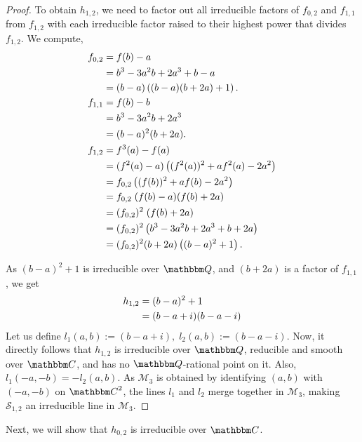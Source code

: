 \documentclass[reqno]{amsart}
\numberwithin{equation}{section}
\theoremstyle{plain}
\theoremstyle{definition}
\theoremstyle{definition}
\newcommand{\Q}{{\mathbbm Q}}
\newcommand{\C}{{\mathbbm C}}
\begin{document}
    \begin{proof}
        To obtain $h_{1,2}$, we need to factor out all irreducible factors of $f_{0,2}$ and $f_{1,1}$ from $f_{1,2}$ with each irreducible factor raised to their highest power that divides $f_{1,2}$. We compute,  
        \begin{align}
            f_{0,2} & =f(b)-a \notag\\
            & = b^{3} -3a^{2}b+2a^{3}+b-a \notag\\
            & = (b-a)\left((b-a)(b+2a)+1\right). \label{h023.}\\
            f_{1,1} & =f(b)-b \notag \\
            & =b^{3}-3a^{2}b+2a^{3}\notag \\
            & =(b-a)^{2}(b+2a).\label{f113}\\
            f_{1,2} & =f^{3}(a)-f(a)\notag \\
            & =(f^{2}(a)-a)\left((f^{2}(a))^{2}+af^{2}(a)-2a^{2}\right)\notag \\
            & = f_{0,2} \left((f(b))^{2}+af(b)-2a^{2}\right)\notag \\
            & = f_{0,2}\; (f(b)-a)(f(b)+2a)\notag \\
            & = (f_{0,2})^{2} \;(f(b)+2a)\label{f123byf023}\\
            & = (f_{0,2})^{2}\left(b^{3}-3a^{2}b+2a^{3}+b+2a \right)\notag \\
            & = (f_{0,2})^{2} (b+2a)\left((b-a)^{2}+1\right).\label{f123}
        \end{align}
        
        As  $(b-a)^{2}+1$ is irreducible over $\Q$, and $(b+2a)$ is a factor of $f_{1,1}$, we get 
        \begin{align}
            h_{1,2} & =(b-a)^{2}+1 \label{h12}\\
            & = (b-a+i)(b-a-i) \notag
        \end{align}
        Let us define $l_{1}(a,b):=(b-a+i),\; l_{2}(a,b):=(b-a-i)$. Now, it directly follows that $h_{1,2}$ is irreducible over $\Q$, reducible and smooth over $\C$, and has no $\Q$-rational point on it. Also, $l_{1}(-a,-b)=-l_{2}(a,b)$. As $\mathcal{M}_{3}$ is obtained by identifying $(a,b)$ with $(-a,-b)$ on $\C^{2}$, the lines $l_{1}$ and $l_{2}$ merge together in $\mathcal{M}_{3}$, making $\mathscr{S}_{1,2}$ an irreducible line in $\mathcal{M}_{3}$.  
    \end{proof}
    Next, we will show that $h_{0,2}$ is irreducible over $\C$. 
\end{document}
